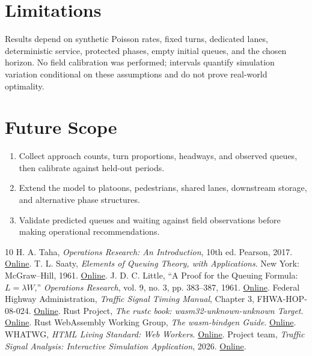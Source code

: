 \documentclass[12pt,a4paper]{report}
\begin{document}
\section{Limitations}
Results depend on synthetic Poisson rates, fixed turns, dedicated lanes, deterministic service, protected phases, empty initial queues, and the chosen horizon. No field calibration was performed; intervals quantify simulation variation conditional on these assumptions and do not prove real-world optimality.

\section{Future Scope}
\begin{enumerate}
\item Collect approach counts, turn proportions, headways, and observed queues, then calibrate against held-out periods.
\item Extend the model to platoons, pedestrians, shared lanes, downstream storage, and alternative phase structures.
\item Validate predicted queues and waiting against field observations before making operational recommendations.
\end{enumerate}

\begin{thebibliography}{10}
 H. A. Taha, \emph{Operations Research: An Introduction}, 10th ed. Pearson, 2017. \href{https://www.pearson.com/en-gb/subject-catalog/p/Taha-Operations-Research-An-Introduction-Global-Edition-10th-Edition/P200000005533}{Online}.
 T. L. Saaty, \emph{Elements of Queuing Theory, with Applications}. New York: McGraw--Hill, 1961. \href{https://books.google.com/books?id=NdI-AAAAIAAJ}{Online}.
 J. D. C. Little, ``A Proof for the Queuing Formula: $L=\lambda W$,'' \emph{Operations Research}, vol. 9, no. 3, pp. 383--387, 1961. \href{https://doi.org/10.1287/opre.9.3.383}{Online}.
 Federal Highway Administration, \emph{Traffic Signal Timing Manual}, Chapter 3, FHWA-HOP-08-024. \href{https://ops.fhwa.dot.gov/publications/fhwahop08024/chapter3.htm}{Online}.
 Rust Project, \emph{The rustc book: wasm32-unknown-unknown Target}. \href{https://doc.rust-lang.org/rustc/platform-support/wasm32-unknown-unknown.html}{Online}.
 Rust WebAssembly Working Group, \emph{The wasm-bindgen Guide}. \href{https://wasm-bindgen.github.io/wasm-bindgen/}{Online}.
 WHATWG, \emph{HTML Living Standard: Web Workers}. \href{https://html.spec.whatwg.org/multipage/workers.html}{Online}.
 Project team, \emph{Traffic Signal Analysis: Interactive Simulation Application}, 2026. \href{https://traffic-signal-analysis.pages.dev/}{Online}.
\end{thebibliography}
\end{document}
